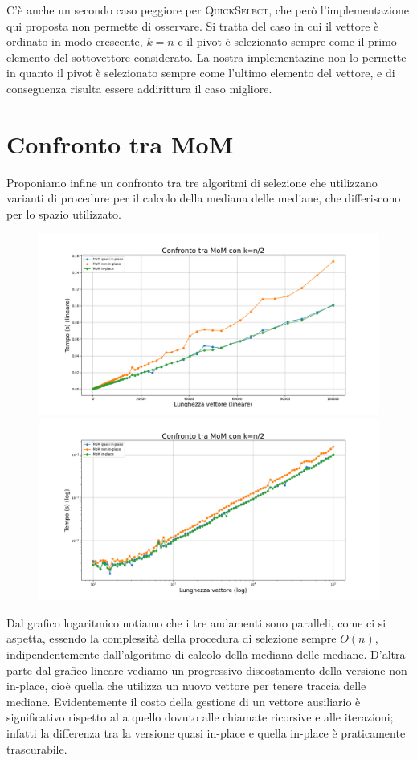 \documentclass[a4paper,12pt]{article}
\newcommand{\QuickSelect}{\textsc{QuickSelect}}
\begin{document}
C'è anche un secondo caso peggiore per \QuickSelect{}, che però l'implementazione qui proposta non permette di osservare.
Si tratta del caso in cui il vettore è ordinato in modo crescente, $k=n$ e il pivot è selezionato sempre come il primo elemento del sottovettore considerato.
La nostra implementazine non lo permette in quanto il pivot è selezionato sempre come l'ultimo elemento del vettore, e di conseguenza risulta essere addirittura il caso migliore.



\section{Confronto tra MoM}
\label{sec:confronto-mom}
Proponiamo infine un confronto tra tre algoritmi di selezione che utilizzano varianti di procedure per il calcolo della mediana delle mediane, che differiscono per lo spazio utilizzato.

\begin{figure}[h]
    \centering
    \includegraphics[width=.83\textwidth]{graphs/MoMs_n.png}
    \includegraphics[width=.83\textwidth]{graphs/MoMs_2xlog.png}
\end{figure}

Dal grafico logaritmico notiamo che i tre andamenti sono paralleli, come ci si aspetta, essendo la complessità della procedura di selezione sempre $O(n)$, indipendentemente dall'algoritmo di calcolo della mediana delle mediane.
D'altra parte dal grafico lineare vediamo un progressivo discostamento della versione non-in-place, cioè quella che utilizza un nuovo vettore per tenere traccia delle mediane.
Evidentemente il costo della gestione di un vettore ausiliario è significativo rispetto al a quello dovuto alle chiamate ricorsive e alle iterazioni; infatti la differenza tra la versione quasi in-place e quella in-place è praticamente trascurabile.
\end{document}

